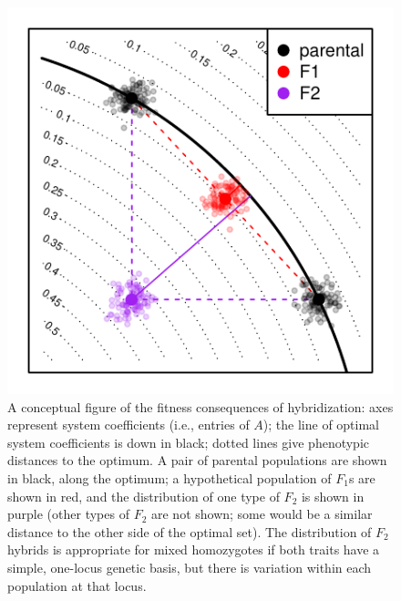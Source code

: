 \documentclass{article}
\newcommand{\1}{\mathbbm{1}}
\begin{document}
\begin{figure}[H]
\centering
\includegraphics{figures/conceptual_fig}
\caption{
    \label{fig:conceptual_fig}
    A conceptual figure of the fitness consequences of hybridization:
    axes represent system coefficients (i.e., entries of $A$);
    the line of optimal system coefficients is down in black;
    dotted lines give phenotypic distances to the optimum.
    A pair of parental populations are shown in black, along the optimum;
    a hypothetical population of $F_1$s are shown in red,
    and the distribution of one type of $F_2$ is shown in purple
    (other types of $F_2$ are not shown; 
    some would be a similar distance to the other side of the optimal set).
    The distribution of $F_2$ hybrids is appropriate for mixed homozygotes
    if both traits have a simple, one-locus genetic basis,
    but there is variation within each population at that locus.
}
\end{figure}
\end{document}
